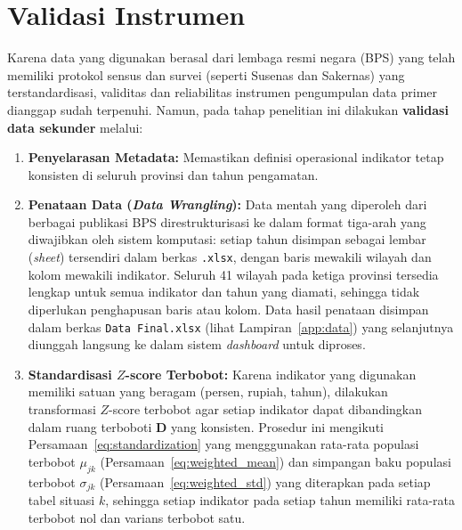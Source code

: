 \section{\normalsize Validasi Instrumen}
Karena data yang digunakan berasal dari lembaga resmi negara (BPS) yang telah memiliki protokol sensus dan survei (seperti Susenas dan Sakernas) yang terstandardisasi, validitas dan reliabilitas instrumen pengumpulan data primer dianggap sudah terpenuhi. Namun, pada tahap penelitian ini dilakukan \textbf{validasi data sekunder} melalui:
\begin{enumerate}
    \item \textbf{Penyelarasan Metadata:} Memastikan definisi operasional indikator tetap konsisten di seluruh provinsi dan tahun pengamatan.
    \item \textbf{Penataan Data (\textit{Data Wrangling}):} Data mentah yang diperoleh dari berbagai publikasi BPS direstrukturisasi ke dalam format tiga-arah yang diwajibkan oleh sistem komputasi: setiap tahun disimpan sebagai lembar (\textit{sheet}) tersendiri dalam berkas \texttt{.xlsx}, dengan baris mewakili wilayah dan kolom mewakili indikator. Seluruh 41 wilayah pada ketiga provinsi tersedia lengkap untuk semua indikator dan tahun yang diamati, sehingga tidak diperlukan penghapusan baris atau kolom. Data hasil penataan disimpan dalam berkas \texttt{Data Final.xlsx} (lihat Lampiran~\ref{app:data}) yang selanjutnya diunggah langsung ke dalam sistem \textit{dashboard} untuk diproses.
    \item \textbf{Standardisasi $Z$-score Terbobot:} Karena indikator yang digunakan memiliki satuan yang beragam (persen, rupiah, tahun), dilakukan transformasi $Z$-score terbobot agar setiap indikator dapat dibandingkan dalam ruang terboboti $\mathbf{D}$ yang konsisten. Prosedur ini mengikuti Persamaan~\ref{eq:standardization} yang mengggunakan rata-rata populasi terbobot $\mu_{jk}$ (Persamaan~\ref{eq:weighted_mean}) dan simpangan baku populasi terbobot $\sigma_{jk}$ (Persamaan~\ref{eq:weighted_std}) yang diterapkan pada setiap tabel situasi $k$, sehingga setiap indikator pada setiap tahun memiliki rata-rata terbobot nol dan varians terbobot satu.
\end{enumerate}

